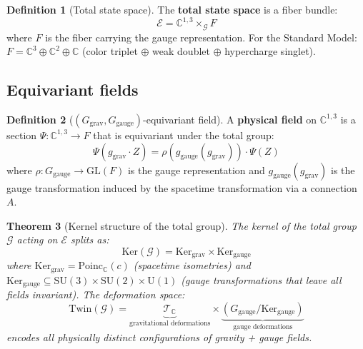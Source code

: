 \documentclass[12pt]{article}
\theoremstyle{plain}
\newtheorem{theorem}{Theorem}[section]
\theoremstyle{definition}
\newtheorem{definition}[theorem]{Definition}
\theoremstyle{remark}
\newcommand{\Ker}{\mathrm{Ker}}
\newcommand{\Twin}{\mathrm{Twin}}
\newcommand{\Poinc}{\mathrm{Poinc}}
\newcommand{\SU}{\mathrm{SU}}
\newcommand{\GL}{\mathrm{GL}}
\newcommand{\UU}{\mathrm{U}}
\newcommand{\CC}{\mathbb{C}}
\begin{document}
\begin{definition}[Total state space]\label{def:total-state}
The \textbf{total state space} is a fiber bundle:
\begin{equation}
\mathcal{E} = \CC^{1,3} \times_\mathcal{G} F
\end{equation}
where $F$ is the fiber carrying the gauge representation. For the Standard Model: $F = \CC^3 \oplus \CC^2 \oplus \CC$ (color triplet $\oplus$ weak doublet $\oplus$ hypercharge singlet).
\end{definition}

\subsection{Equivariant fields}

\begin{definition}[$(G_{\mathrm{grav}}, G_{\mathrm{gauge}})$-equivariant field]\label{def:field}
A \textbf{physical field} on $\CC^{1,3}$ is a section $\Psi: \CC^{1,3} \to F$ that is equivariant under the total group:
\begin{equation}\label{eq:field-equivariant}
\Psi(g_{\mathrm{grav}} \cdot Z) = \rho(g_{\mathrm{gauge}}(g_{\mathrm{grav}})) \cdot \Psi(Z)
\end{equation}
where $\rho: G_{\mathrm{gauge}} \to \GL(F)$ is the gauge representation and $g_{\mathrm{gauge}}(g_{\mathrm{grav}})$ is the gauge transformation induced by the spacetime transformation via a connection $A$.
\end{definition}

\begin{theorem}[Kernel structure of the total group]\label{thm:total-kernel}
The kernel of the total group $\mathcal{G}$ acting on $\mathcal{E}$ splits as:
\begin{equation}
\Ker(\mathcal{G}) = \Ker_{\mathrm{grav}} \times \Ker_{\mathrm{gauge}}
\end{equation}
where $\Ker_{\mathrm{grav}} = \Poinc_\CC(c)$ (spacetime isometries) and $\Ker_{\mathrm{gauge}} \subseteq \SU(3) \times \SU(2) \times \UU(1)$ (gauge transformations that leave all fields invariant). The deformation space:
\begin{equation}
\Twin(\mathcal{G}) = \underbrace{\mathcal{T}_\CC}_{\text{gravitational deformations}} \times \underbrace{(G_{\mathrm{gauge}}/\Ker_{\mathrm{gauge}})}_{\text{gauge deformations}}
\end{equation}
encodes all physically distinct configurations of gravity + gauge fields.
\end{theorem}
\end{document}
